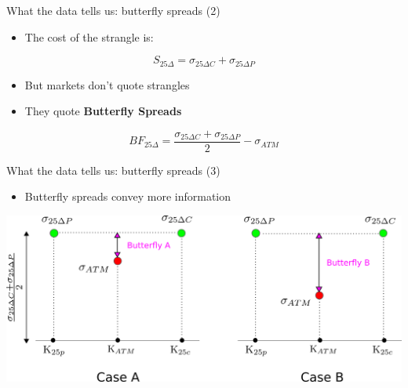 \begin{frame}{What the data tells us: butterfly spreads (2)}

\begin{itemize}
\tightlist
\item
  The cost of the strangle is:
\end{itemize}

\[
S_{25\Delta} = \sigma_{25\Delta C} + \sigma_{25\Delta P}
\]

\begin{itemize}
\tightlist
\item
  But markets don't quote strangles\\[2\baselineskip]
\item
  They quote \textbf{Butterfly Spreads}
\end{itemize}

\[
BF_{25\Delta} = \frac{\sigma_{25\Delta C} + \sigma_{25\Delta P}}{2}  - \sigma_{ATM}
\]

\end{frame}

\begin{frame}{What the data tells us: butterfly spreads (3)}

\begin{itemize}
\tightlist
\item
  Butterfly spreads convey more information
\end{itemize}

\begin{center}\includegraphics[width=1\linewidth]{images/figStrangleButterfly} \end{center}

\end{frame}

